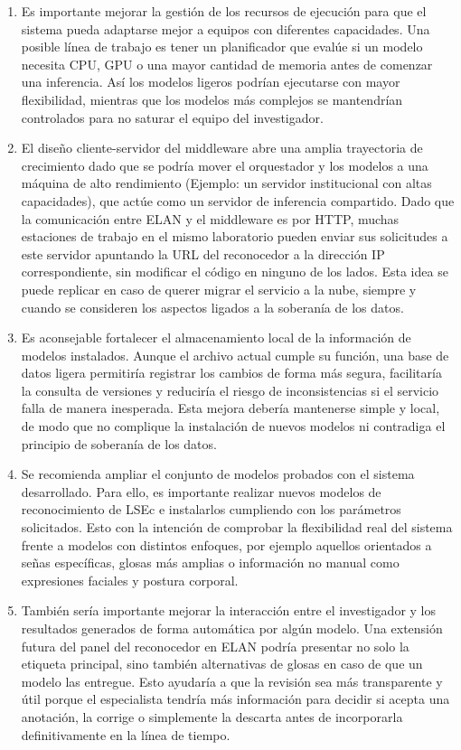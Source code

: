 \documentclass[11pt,a4paper]{article}
\begin{document}
\begin{enumerate}
    \item Es importante mejorar la gestión de los recursos de ejecución para que el sistema pueda adaptarse mejor a equipos con diferentes capacidades. Una posible línea de trabajo es tener un planificador que evalúe si un modelo necesita CPU, GPU o una mayor cantidad de memoria antes de comenzar una inferencia. Así los modelos ligeros podrían ejecutarse con mayor flexibilidad, mientras que los modelos más complejos se mantendrían controlados para no saturar el equipo del investigador.

    \item El diseño cliente-servidor del middleware abre una amplia trayectoria de crecimiento dado que se podría mover el orquestador y los modelos a una máquina de alto rendimiento (Ejemplo: un servidor institucional con altas capacidades), que actúe como un servidor de inferencia compartido. Dado que la comunicación entre ELAN y el middleware es por HTTP, muchas estaciones de trabajo en el mismo laboratorio pueden enviar sus solicitudes a este servidor apuntando la URL del reconocedor a la dirección IP correspondiente, sin modificar el código en ninguno de los lados. Esta idea se puede replicar en caso de querer migrar el servicio a la nube, siempre y cuando se consideren los aspectos ligados a la soberanía de los datos.
    
    \item Es aconsejable fortalecer el almacenamiento local de la información de modelos instalados. Aunque el archivo actual cumple su función, una base de datos ligera permitiría registrar los cambios de forma más segura, facilitaría la consulta de versiones y reduciría el riesgo de inconsistencias si el servicio falla de manera inesperada. Esta mejora debería mantenerse simple y local, de modo que no complique la instalación de nuevos modelos ni contradiga el principio de soberanía de los datos. 

    \item Se recomienda ampliar el conjunto de modelos probados con el sistema desarrollado. Para ello, es importante realizar nuevos modelos de reconocimiento de LSEc e instalarlos cumpliendo con los parámetros solicitados. Esto con la intención de comprobar la flexibilidad real del sistema frente a modelos con distintos enfoques, por ejemplo aquellos orientados a señas específicas, glosas más amplias o información no manual como expresiones faciales y postura corporal.
    
    \item También sería importante mejorar la interacción entre el investigador y los resultados generados de forma automática por algún modelo. Una extensión futura del panel del reconocedor en ELAN podría presentar no solo la etiqueta principal, sino también alternativas de glosas en caso de que un modelo las entregue. Esto ayudaría a que la revisión sea más transparente y útil porque el especialista tendría más información para decidir si acepta una anotación, la corrige o simplemente la descarta antes de incorporarla definitivamente en la línea de tiempo.


\end{enumerate}
\end{document}
